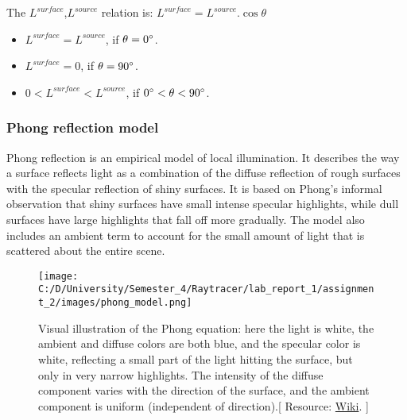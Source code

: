 \documentclass{article}
\begin{document}
The  $L^{surface}$,$ L^{source}$ relation is: $L^{surface} = L^{source}.\cos \theta $
\begin{itemize}
	\item $L^{surface} = L^{source}$, if $\theta = 0\degree$.
	\item $L^{surface} = 0$, if $\theta = 90\degree$.
    \item $0 < L^{surface} < L^{source}$, if $0\degree < \theta  < 90\degree$.
\end{itemize}

\subsubsection{Phong reflection model }
Phong reflection is an empirical model of local illumination. It describes the way a surface reflects light as a combination of the diffuse reflection of rough surfaces with the specular reflection of shiny surfaces. It is based on Phong's informal observation that shiny surfaces have small intense specular highlights, while dull surfaces have large highlights that fall off more gradually. The model also includes an ambient term to account for the small amount of light that is scattered about the entire scene.
\\

	\begin{figure}[H]
	\begin{center}
		\texttt{[image: C:/D/University/Semester\_4/Raytracer/lab\_report\_1/assignment\_2/images/phong\_model.png]}
		
		\caption{Visual illustration of the Phong equation: here the light is white, the ambient and diffuse colors are both blue, and the specular color is white, reflecting a small part of the light hitting the surface, but only in very narrow highlights. The intensity of the diffuse component varies with the direction of the surface, and the ambient component is uniform (independent of direction).[ Resource: \href{https://en.wikipedia.org/wiki/Phong_reflection_model}{Wiki}.
			]}
		\label{fig:boat1}
	\end{center}
\end{figure}
\end{document}
